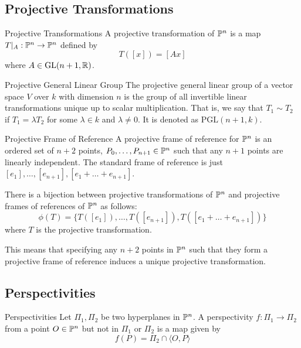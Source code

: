 \documentclass[a4paper]{article}
\begin{document}
\subsection{Projective Transformations}
\begin{defn}{Projective Transformations}{} A projective transformation of $\mathbb{P}^n$ is a map $T|_A:\mathbb{P}^n\to\mathbb{P}^n$ defined by $$T([x])=[Ax]$$ where $A\in\text{GL}(n+1,\mathbb{R})$. 
\end{defn}

\begin{defn}{Projective General Linear Group}{} The projective general linear group of a vector space $V$ over $k$ with dimension $n$ is the group of all invertible linear transformations unique up to scalar multiplication. That is, we say that $T_1\sim T_2$ if $T_1=\lambda T_2$ for some $\lambda\in k$ and $\lambda\neq0$. It is denoted as $\text{PGL}(n+1,k)$. 
\end{defn}

\begin{defn}{Projective Frame of Reference}{} A projective frame of reference for $\mathbb{P}^n$ is an ordered set of $n+2$ points, $P_0,\dots,P_{n+1}\in\mathbb{P}^n$ such that any $n+1$ points are linearly independent. The standard frame of reference is just $[e_1],\dots,[e_{n+1}],[e_1+\dots+e_{n+1}]$. 
\end{defn}

\begin{prp}{}{} There is a bijection between projective transformations of $\mathbb{P}^n$ and projective frames of references of $\mathbb{P}^n$ as follows: $$\phi(T)=\{T([e_1]),\dots,T([e_{n+1}]),T([e_1+\dots+e_{n+1}])\}$$ where $T$ is the projective transformation. 
\end{prp}

This means that specifying any $n+2$ points in $\mathbb{P}^n$ such that they form a projective frame of reference induces a unique projective transformation. 

\subsection{Perspectivities}
\begin{defn}{Perspectivities}{} Let $\Pi_1,\Pi_2$ be two hyperplanes in $\mathbb{P}^n$. A perspectivity $f:\Pi_1\to\Pi_2$ from a point $O\in\mathbb{P}^n$ but not in $\Pi_1$ or $\Pi_2$ is a map given by $$f(P)=\Pi_2\cap\langle O,P\rangle$$
\end{defn}
\end{document}
